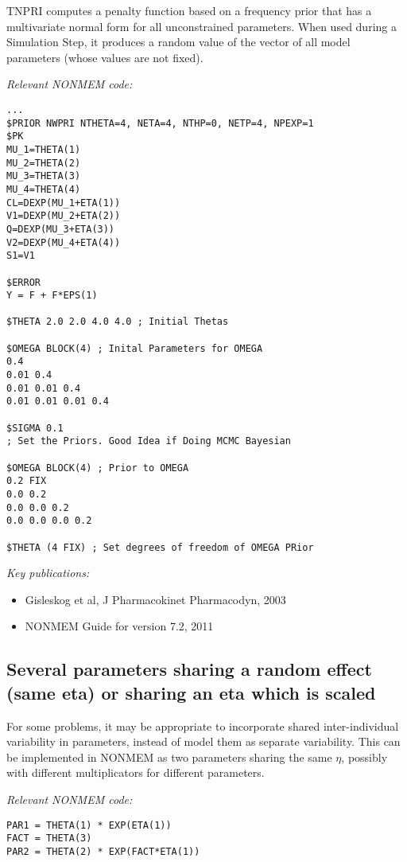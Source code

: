 \documentclass[a4paper,11pt]{article}
\begin{document}
TNPRI computes a penalty function based on a frequency prior that has
a multivariate normal form for all unconstrained parameters.  When
used during a Simulation Step, it produces a random value of the
vector of all model parameters (whose values are not fixed).

\vspace{10pt}

\noindent \emph{Relevant NONMEM code:}
\begin{lstlisting}
...
$PRIOR NWPRI NTHETA=4, NETA=4, NTHP=0, NETP=4, NPEXP=1
$PK
MU_1=THETA(1)
MU_2=THETA(2)
MU_3=THETA(3)
MU_4=THETA(4)
CL=DEXP(MU_1+ETA(1))
V1=DEXP(MU_2+ETA(2))
Q=DEXP(MU_3+ETA(3))
V2=DEXP(MU_4+ETA(4))
S1=V1

$ERROR
Y = F + F*EPS(1)

$THETA 2.0 2.0 4.0 4.0 ; Initial Thetas

$OMEGA BLOCK(4) ; Inital Parameters for OMEGA
0.4
0.01 0.4
0.01 0.01 0.4
0.01 0.01 0.01 0.4

$SIGMA 0.1
; Set the Priors. Good Idea if Doing MCMC Bayesian

$OMEGA BLOCK(4) ; Prior to OMEGA
0.2 FIX
0.0 0.2
0.0 0.0 0.2
0.0 0.0 0.0 0.2

$THETA (4 FIX) ; Set degrees of freedom of OMEGA PRior
\end{lstlisting}

\noindent \emph{Key publications:}
\begin{itemize}
\item Gisleskog et al, J Pharmacokinet Pharmacodyn, 2003
\item NONMEM Guide for version 7.2, 2011
\end{itemize}

\subsection{Several parameters sharing a random effect (same eta) or sharing an eta which is scaled}
For some problems, it may be appropriate to incorporate shared
inter-individual variability in parameters, instead of model them as
separate variability. This can be implemented in NONMEM as two
parameters sharing the same $\eta$, possibly with different multiplicators for
different parameters.

\vspace{10pt}
\noindent \emph{Relevant NONMEM code:}
\begin{lstlisting}
PAR1 = THETA(1) * EXP(ETA(1))
FACT = THETA(3)
PAR2 = THETA(2) * EXP(FACT*ETA(1))
\end{lstlisting}
\end{document}
